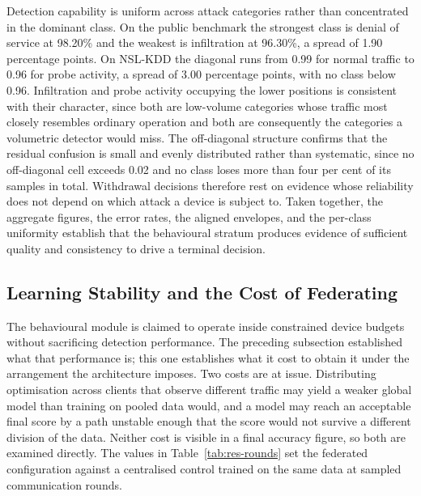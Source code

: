 Detection capability is uniform across attack categories rather than concentrated in the dominant class. On the public benchmark the strongest class is denial of service at 98.20\% and the weakest is infiltration at 96.30\%, a spread of 1.90 percentage points. On NSL-KDD the diagonal runs from 0.99 for normal traffic to 0.96 for probe activity, a spread of 3.00 percentage points, with no class below 0.96. Infiltration and probe activity occupying the lower positions is consistent with their character, since both are low-volume categories whose traffic most closely resembles ordinary operation and both are consequently the categories a volumetric detector would miss. The off-diagonal structure confirms that the residual confusion is small and evenly distributed rather than systematic, since no off-diagonal cell exceeds 0.02 and no class loses more than four per cent of its samples in total. Withdrawal decisions therefore rest on evidence whose reliability does not depend on which attack a device is subject to.
Taken together, the aggregate figures, the error rates, the aligned envelopes, and the per-class uniformity establish that the behavioural stratum produces evidence of sufficient quality and consistency to drive a terminal decision.


\subsection{Learning Stability and the Cost of Federating}
\label{sec:eval-learning}

The behavioural module is claimed to operate inside constrained device budgets without sacrificing detection performance. The preceding subsection established what that performance is; this one establishes what it cost to obtain it under the arrangement the architecture imposes. Two costs are at issue. Distributing optimisation across clients that observe different traffic may yield a weaker global model than training on pooled data would, and a model may reach an acceptable final score by a path unstable enough that the score would not survive a different division of the data. Neither cost is visible in a final accuracy figure, so both are examined directly. The values in Table~\ref{tab:res-rounds} set the federated configuration against a centralised control trained on the same data at sampled communication rounds.

